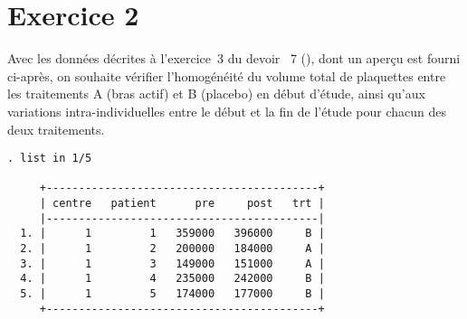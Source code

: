 \section*{Exercice 2}
Avec les données décrites à l'exercice~3 du devoir \no~7
(\pageref{dev7:exo3}), dont un aperçu est fourni ci-après, on souhaite
vérifier l'homogénéité du volume total de plaquettes entre les traitements A
(bras actif) et B (placebo) en début d'étude, ainsi qu'aux variations
intra-individuelles entre le début et la fin de l'étude pour chacun des deux
traitements.
\begin{verbatim}
. list in 1/5

     +------------------------------------------+
     | centre   patient      pre     post   trt |
     |------------------------------------------|
  1. |      1         1   359000   396000     B |
  2. |      1         2   200000   184000     A |
  3. |      1         3   149000   151000     A |
  4. |      1         4   235000   242000     B |
  5. |      1         5   174000   177000     B |
     +------------------------------------------+
\end{verbatim}
